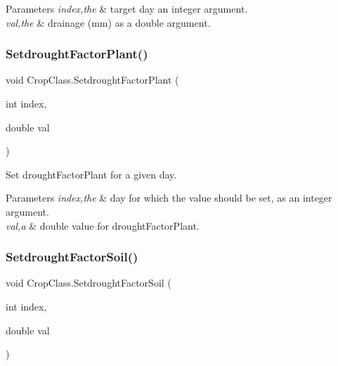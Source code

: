 \begin{DoxyParams}{Parameters}
{\em index,the} & target day an integer argument. \\
\hline
{\em val,the} & drainage (mm) as a double argument. \\
\hline
\end{DoxyParams}
\mbox{\label{class_crop_class_aefba485b0eb0cd124efac1b597346d86}} 
\subsubsection{\texorpdfstring{SetdroughtFactorPlant()}{SetdroughtFactorPlant()}}
{\footnotesize\ttfamily void Crop\+Class.\+Setdrought\+Factor\+Plant (\begin{DoxyParamCaption}\item[{int}]{index,  }\item[{double}]{val }\end{DoxyParamCaption})\hspace{0.3cm}{\ttfamily [inline]}}



Set drought\+Factor\+Plant for a given day. 


\begin{DoxyParams}{Parameters}
{\em index,the} & day for which the value should be set, as an integer argument. \\
\hline
{\em val,a} & double value for drought\+Factor\+Plant. \\
\hline
\end{DoxyParams}
\mbox{\label{class_crop_class_a2bcefb01fa7786fa0748309762c836e6}} 
\subsubsection{\texorpdfstring{SetdroughtFactorSoil()}{SetdroughtFactorSoil()}}
{\footnotesize\ttfamily void Crop\+Class.\+Setdrought\+Factor\+Soil (\begin{DoxyParamCaption}\item[{int}]{index,  }\item[{double}]{val }\end{DoxyParamCaption})\hspace{0.3cm}{\ttfamily [inline]}}



